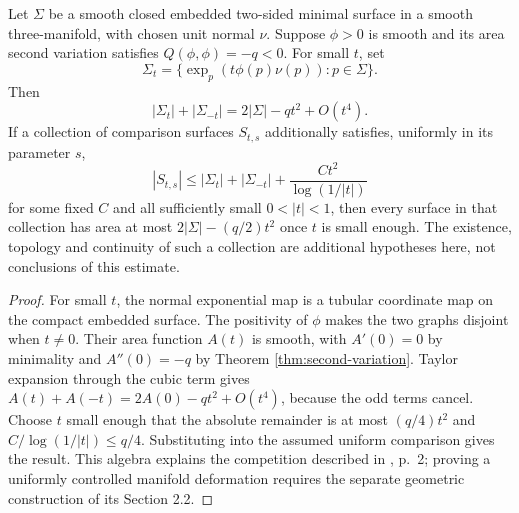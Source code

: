 \begin{proposition}\label{prop:unstable-sheet-logarithmic-comparison}
Let $\Sigma$ be a smooth closed embedded two-sided minimal surface in a smooth three-manifold, with chosen unit normal $\nu$. Suppose $\phi>0$ is smooth and its area second variation satisfies $Q(\phi,\phi)=-q<0$. For small $t$, set
\[
 \Sigma_t=\{\exp_p(t\phi(p)\nu(p)):p\in\Sigma\}.
\]
Then
\[
 |\Sigma_t|+|\Sigma_{-t}|=2|\Sigma|-qt^2+O(t^4).
\]
If a collection of comparison surfaces $S_{t,s}$ additionally satisfies, uniformly in its parameter $s$,
\[
 |S_{t,s}|\leq |\Sigma_t|+|\Sigma_{-t}|
       +\frac{Ct^2}{\log(1/|t|)}
\]
for some fixed $C$ and all sufficiently small $0<|t|<1$, then every surface in that collection has area at most $2|\Sigma|-(q/2)t^2$ once $t$ is small enough. The existence, topology and continuity of such a collection are additional hypotheses here, not conclusions of this estimate.
\end{proposition}
\begin{proof}
For small $t$, the normal exponential map is a tubular coordinate map on the compact embedded surface. The positivity of $\phi$ makes the two graphs disjoint when $t\ne0$. Their area function $A(t)$ is smooth, with $A'(0)=0$ by minimality and $A''(0)=-q$ by Theorem \ref{thm:second-variation}. Taylor expansion through the cubic term gives
$A(t)+A(-t)=2A(0)-qt^2+O(t^4)$, because the odd terms cancel. Choose $t$ small enough that the absolute remainder is at most $(q/4)t^2$ and $C/\log(1/|t|)\leq q/4$. Substituting into the assumed uniform comparison gives the result. This algebra explains the competition described in \cite{KMN}, p.~2; proving a uniformly controlled manifold deformation requires the separate geometric construction of its Section 2.2.
\end{proof}
